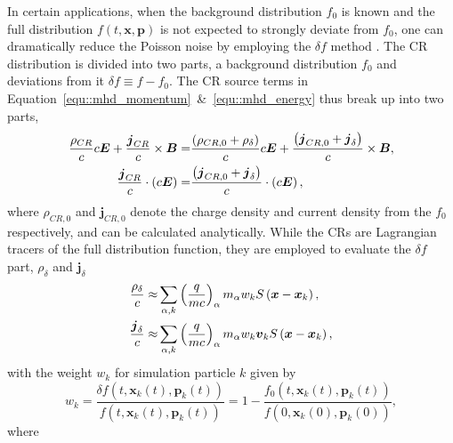 \documentclass[fleqn,usenatbib]{mnras}
\begin{document}
In certain applications, when the background distribution $f_0$ is known and the full distribution $f\left(t, \boldsymbol{x}, \boldsymbol{p} \right)$ is not expected to strongly deviate from $f_0$, one can dramatically reduce the Poisson noise by employing the $\delta f$ method \citep[e.g.][]{1993PhFlB...5...77P, 1994PhPl....1..863H, 1995JCoPh.119..283D, 2014JCoPh.259..154K, 2019ApJ...876...60B}. The CR distribution is divided into two parts, a background distribution $f_0$
and deviations from it $\delta f \equiv f - f_0$.
The CR source terms in Equation~\ref{equ::mhd_momentum}~\&~\ref{equ::mhd_energy} thus break up into two parts,
\begin{align}
	\frac{\rho_{CR}}{c} c\boldsymbol{E} + \frac{\boldsymbol{j}_{CR}}{c} \times \boldsymbol{B} =& \frac{\left(\rho_{CR,0} + \rho_{\delta}\right)}{c} c\boldsymbol{E} + \frac{\left(\boldsymbol{j}_{CR,0} + \boldsymbol{j}_{\delta}\right)}{c} \times \boldsymbol{B}, \notag \\
	\frac{\boldsymbol{j}_{CR}}{c} \cdot \left(c\boldsymbol{E}\right) =& \frac{\left(\boldsymbol{j}_{CR,0} + \boldsymbol{j}_{\delta}\right)}{c} \cdot \left(c\boldsymbol{E}\right), \label{equ::delta_f_source} 
\end{align}
where $\rho_{CR,0}$ and $\boldsymbol{j}_{CR,0}$ denote the charge density and current density from the $f_0$ respectively, and can be calculated analytically. 
While the CRs are Lagrangian tracers of the full distribution function, they are employed to evaluate
the $\delta f$ part, $\rho_\delta$ and $\boldsymbol{j}_\delta$
\begin{align}
	\frac{\rho_{\delta}}{c} \approx & \sum_{\alpha, k} \left(\frac{q}{mc}\right)_\alpha m_\alpha w_k S\left(\boldsymbol{x} - \boldsymbol{x}_k \right), \notag \\
	\frac{\boldsymbol{j}_{\delta}}{c} \approx & \sum_{\alpha, k} \left(\frac{q}{mc}\right)_\alpha m_\alpha w_k \boldsymbol{v}_k S\left(\boldsymbol{x} - \boldsymbol{x}_k \right),
\end{align}
with the weight $w_k$ 
for simulation particle $k$ given by
\begin{equation*}
	w_k = \frac{\delta f\left(t, \boldsymbol{x}_k\left(t\right), \boldsymbol{p}_k\left(t\right)\right)}{f\left(t, \boldsymbol{x}_k\left(t\right), \boldsymbol{p}_k\left(t\right)\right)} = 1- \frac{f_0\left(t, \boldsymbol{x}_k\left(t\right), \boldsymbol{p}_k\left(t\right)\right)}{f\left(0, \boldsymbol{x}_k\left(0\right), \boldsymbol{p}_k\left(0\right)\right)},
\end{equation*}
where
\end{document}
